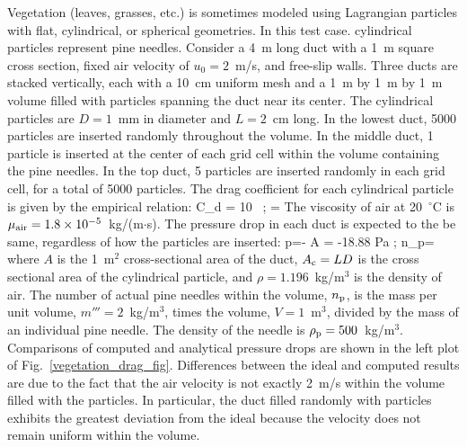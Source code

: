 \documentclass[11pt]{book}
\begin{document}
Vegetation (leaves, grasses, etc.) is sometimes modeled using Lagrangian particles with flat, cylindrical, or spherical geometries. In this test case. cylindrical particles represent pine needles. Consider a 4~m long duct with a 1~m square cross section, fixed air velocity of $u_0=2$~m/s, and free-slip walls. Three ducts are stacked vertically, each with a 10~cm uniform mesh and a 1~m by 1~m by 1~m volume filled with particles spanning the duct near its center. The cylindrical particles are $D=1$~mm in diameter and $L=2$~cm long. In the lowest duct, 5000 particles are inserted randomly throughout the volume. In the middle duct, 1 particle is inserted at the center of each grid cell within the volume containing the pine needles. In the top duct, 5 particles are inserted randomly in each grid cell, for a total of 5000 particles. The drag coefficient for each cylindrical particle is given by the empirical relation:
\be
   C_{\rm d} = 10 \,   \quad ; \quad \RE =  
\ee
The viscosity of air at 20~$^\circ$C is $\mu_{\rm air}=1.8\times 10^{-5}$~kg/(m$\cdot$s). The pressure drop in each duct is expected to the be same, regardless of how the particles are inserted:
\be
   \Delta p=- \rho {} {A} = -18.88 \; {\rm Pa}  \quad ; \quad n_{\rm p}= 
\ee
where $A$ is the 1~m$^2$ cross-sectional area of the duct, $A_{\rm c}=LD$ is the cross sectional area of the cylindrical particle, and $\rho=1.196$~kg/m$^3$ is the density of air. The number of actual pine needles within the volume, $n_{\rm p}$, is the mass per unit volume, $m'''=2$~kg/m$^3$, times the volume, $V=1$~m$^3$, divided by the mass of an individual pine needle. The density of the needle is $\rho_{\rm p}=500$~kg/m$^3$. Comparisons of computed and analytical pressure drops are shown in the left plot of Fig.~\ref{vegetation_drag_fig}. Differences between the ideal and computed results are due to the fact that the air velocity is not exactly 2~m/s within the volume filled with the particles. In particular, the duct filled randomly with particles exhibits the greatest deviation from the ideal because the velocity does not remain uniform within the volume.
\end{document}

